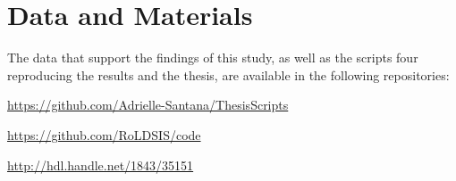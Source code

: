 
\section*{Data and Materials}
The data that support the findings of this study, as well as the scripts four
reproducing the results and the thesis, are available in the following repositories:

\begin{itemize*}
 \item \url{https://github.com/Adrielle-Santana/ThesisScripts}
 \item \url{https://github.com/RoLDSIS/code}
 \item \url{http://hdl.handle.net/1843/35151}
\end{itemize*}






